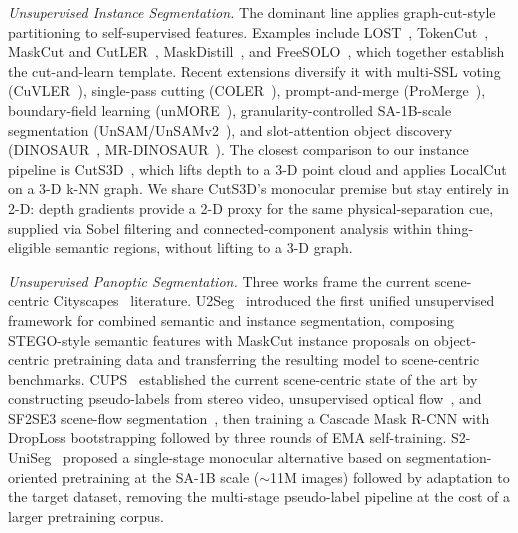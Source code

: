 \documentclass{article}
\renewcommand{\paragraph}[1]{\par\smallskip\noindent\textit{#1}\hspace{0.5em}\ignorespaces}
\begin{document}
\paragraph{Unsupervised Instance Segmentation.}
The dominant line applies graph-cut-style partitioning to self-supervised features. Examples include LOST~\cite{simeoni2021lost}, TokenCut~\cite{wang2023tokencut}, MaskCut and CutLER~\cite{wang2023cutler}, MaskDistill~\cite{vangansbeke2022maskdistill}, and FreeSOLO~\cite{wang2022freesolo}, which together establish the cut-and-learn template. Recent extensions diversify it with multi-SSL voting (CuVLER~\cite{arica2024cuvler}), single-pass cutting (COLER~\cite{feng2025coler}), prompt-and-merge (ProMerge~\cite{li2024promerge}), boundary-field learning (unMORE~\cite{yang2025unmore}), granularity-controlled SA-1B-scale segmentation (UnSAM/UnSAMv2~\cite{wang2024unsam,yu2025unsamv2}), and slot-attention object discovery (DINOSAUR~\cite{seitzer2023dinosaur}, MR-DINOSAUR~\cite{gong2025mrdinosaur}). The closest comparison to our instance pipeline is CutS3D~\cite{sick2025cuts3d}, which lifts depth to a 3-D point cloud and applies LocalCut on a 3-D k-NN graph. We share CutS3D's monocular premise but stay entirely in 2-D: depth gradients provide a 2-D proxy for the same physical-separation cue, supplied via Sobel filtering and connected-component analysis within thing-eligible semantic regions, without lifting to a 3-D graph.

\paragraph{Unsupervised Panoptic Segmentation.}
Three works frame the current scene-centric Cityscapes~\cite{cordts2016cityscapes} literature. U2Seg~\cite{niu2024u2seg} introduced the first unified unsupervised framework for combined semantic and instance segmentation, composing STEGO-style semantic features with MaskCut instance proposals on object-centric pretraining data and transferring the resulting model to scene-centric benchmarks. CUPS~\cite{hahn2025cups} established the current scene-centric state of the art by constructing pseudo-labels from stereo video, unsupervised optical flow~\cite{stone2021smurf}, and SF2SE3 scene-flow segmentation~\cite{sommer2022sf2se3}, then training a Cascade Mask R-CNN with DropLoss bootstrapping followed by three rounds of EMA self-training. S2-UniSeg~\cite{xu2025s2uniseg} proposed a single-stage monocular alternative based on segmentation-oriented pretraining at the SA-1B scale ($\sim$11M images) followed by adaptation to the target dataset, removing the multi-stage pseudo-label pipeline at the cost of a larger pretraining corpus.
\end{document}

